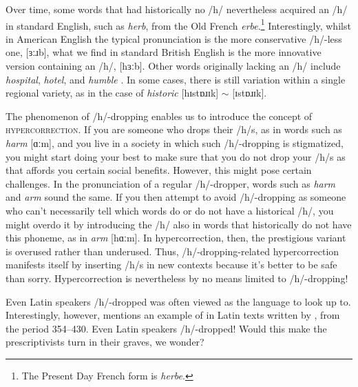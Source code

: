 \largerpage[2]
Over time, some words that had historically no /h/ nevertheless acquired an /h/ in standard English, such as \textit{herb}, from the Old French \textit{erbe}.\footnote{The Present Day French form is \textit{herbe}.} Interestingly, whilst in American English the typical pronunciation is the more conservative /h/-less one, {[}ɜːɹb{]}, what we find in standard British English is the more innovative version containing an /h/, {[}hɜːb{]}. Other words originally lacking an /h/ include \textit{hospital}, \textit{hotel}, and \textit{humble} \citep[145, 148]{Mugglestone2003}. In some cases, there is still variation within a single regional variety, as in the case of \textit{historic} {[}hɪstɒɹɪk{]} $\sim$ {[}ɪstɒɹɪk{]}. 

The phenomenon of /h/-dropping enables us to introduce the concept of \textsc{hypercorrection}. If you are someone who drops their /h/s, as in words such as \textit{harm} [ɑːm], and you live in a society in which such /h/-dropping is stigmatized, you might start doing your best to make sure that you do not drop your /h/s as that affords you certain social benefits. However, this might pose certain challenges. In the pronunciation of a regular /h/-dropper, words such as \textit{harm} and \textit{arm} sound the same. If you then attempt to avoid /h/-dropping as someone who can't necessarily tell which words do or do not have a historical /h/, you might overdo it by introducing the /h/ also in words that historically do not have this phoneme, as in \textit{arm} [hɑːm]. In hypercorrection, then, the prestigious variant is overused rather than underused. Thus, /h/-dropping-related hypercorrection manifests itself by inserting /h/s in new contexts because it's better to be safe than sorry. Hypercorrection is nevertheless by no means limited to /h/-dropping!


\begin{soundbox}{Even Latin speakers /h/-dropped}
 was often viewed as the language to look up to. Interestingly, however, \citet[106]{Minkova2014} mentions an example of  in Latin texts written by , from the period 354--430. Even Latin speakers /h/-dropped! Would this make the prescriptivists turn in their graves, we wonder?
\end{soundbox}


